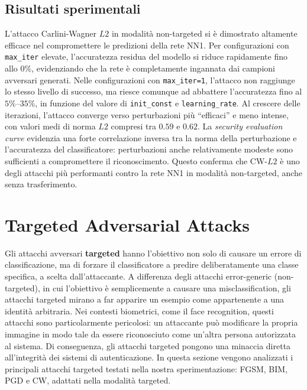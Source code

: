             \subsection{Risultati sperimentali}
                L'attacco Carlini-Wagner $L2$ in modalità non-targeted si è dimostrato altamente efficace nel compromettere le predizioni della rete NN1. Per configurazioni con \texttt{max\_iter} elevate, l’accuratezza residua del modello si riduce rapidamente fino allo $0\%$, evidenziando che la rete è completamente ingannata dai campioni avversari generati.
                Nelle configurazioni con \texttt{max\_iter=1}, l’attacco non raggiunge lo stesso livello di successo, ma riesce comunque ad abbattere l'accuratezza fino al $5\%$–$35\%$, in funzione del valore di \texttt{init\_const} e \texttt{learning\_rate}. Al crescere delle iterazioni, l’attacco converge verso perturbazioni più “efficaci” e meno intense, con valori medi di norma $L2$ compresi tra $0.59$ e $0.62$.
                La \textit{security evaluation curve} evidenzia una forte correlazione inversa tra la norma della perturbazione e l’accuratezza del classificatore: perturbazioni anche relativamente modeste sono sufficienti a compromettere il riconoscimento. Questo conferma che CW-$L2$ è uno degli attacchi più performanti contro la rete NN1 in modalità non-targeted, anche senza trasferimento.

    \clearpage

    \section{Targeted Adversarial Attacks}
        Gli attacchi avversari \textbf{targeted} hanno l’obiettivo non solo di causare un errore di classificazione, ma di forzare il classificatore a predire deliberatamente una classe specifica, a scelta dall’attaccante. A differenza degli attacchi error-generic (non-targeted), in cui l’obiettivo è semplicemente a causare una misclassification, gli attacchi targeted mirano a far apparire un esempio come appartenente a una identità arbitraria.
        Nei contesti biometrici, come il face recognition, questi attacchi sono particolarmente pericolosi: un attaccante può modificare la propria immagine in modo tale da essere riconosciuto come un’altra persona autorizzata al sistema. Di conseguenza, gli attacchi targeted pongono una minaccia diretta all’integrità dei sistemi di autenticazione.
        In questa sezione vengono analizzati i principali attacchi targeted testati nella nostra sperimentazione: FGSM, BIM, PGD e CW, adattati nella modalità targeted.

